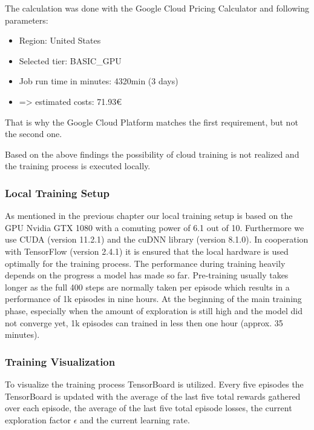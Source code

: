 The calculation was done with the Google Cloud Pricing Calculator \cite{googleeditorGoogleCloudPlatformPreisrechner} and following parameters:
\begin{itemize}
	\item Region: United States
	\item Selected tier: BASIC\_GPU
	\item Job run time in minutes: 4320min (3 days)
	\item => estimated costs: 71.93€
\end{itemize}

That is why the Google Cloud Platform matches the first requirement, but not the second one.

Based on the above findings the possibility of cloud training is not realized and the training process is executed locally. 

\subsubsection{Local Training Setup}
\label{ch:approachBg}

As mentioned in the previous chapter our local training setup is based on the GPU Nvidia GTX 1080 with a comuting power of 6.1 out of 10. Furthermore we use CUDA (version 11.2.1) and the cuDNN library (version 8.1.0). In cooperation with TensorFlow (version 2.4.1) it is ensured that the local hardware is used optimally for the training process. The performance during training heavily depends on the progress a model has made so far. Pre-training usually takes longer as the full 400 steps are normally taken per episode which results in a performance of 1k episodes in nine hours. At the beginning of the main training phase, especially when the amount of exploration is still high and the model did not converge yet, 1k episodes can trained in less then one hour (approx. 35 minutes).  

\subsubsection{Training Visualization}
\label{ch:approachBh}

To visualize the training process TensorBoard is utilized. Every five episodes the TensorBoard is updated with the average of the last five total rewards gathered over each episode, the average of the last five total episode losses, the current exploration factor $\epsilon$ and the current learning rate. 


